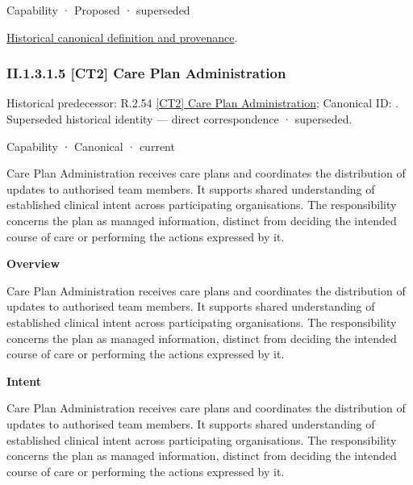 \label{element:9f0f4379c1954524ba5e691d0c7d95ab}
{\small Capability · Proposed · superseded}\par
\href{../../../../../../../continuum/strategy/capability/9f0f4379c1954524ba5e691d0c7d95ab.md}{Historical canonical definition and provenance}.\par
\subsubsection*{II.1.3.1.5 [CT2] Care Plan Administration}
\label{navigation:II.1.3.1.5}

{\small Historical predecessor: R.2.54 \hyperref[element:e31407cea7624632a8ed2dc53b09d726]{[CT2] Care Plan Administration}; Canonical ID: \texttt{}. Superseded historical identity — direct correspondence · superseded.}\par
\label{element:cf06eec5699f406fa30a00d2f76e3098}
{\small Capability · Canonical · current}\par

Care Plan Administration receives care plans and coordinates the distribution of updates to authorised team members. It supports shared understanding of established clinical intent across participating organisations. The responsibility concerns the plan as managed information, distinct from deciding the intended course of care or performing the actions expressed by it.



\textbf{Overview}



Care Plan Administration receives care plans and coordinates the distribution of updates to authorised team members. It supports shared understanding of established clinical intent across participating organisations. The responsibility concerns the plan as managed information, distinct from deciding the intended course of care or performing the actions expressed by it.



\textbf{Intent}



Care Plan Administration receives care plans and coordinates the distribution of updates to authorised team members. It supports shared understanding of established clinical intent across participating organisations. The responsibility concerns the plan as managed information, distinct from deciding the intended course of care or performing the actions expressed by it.



